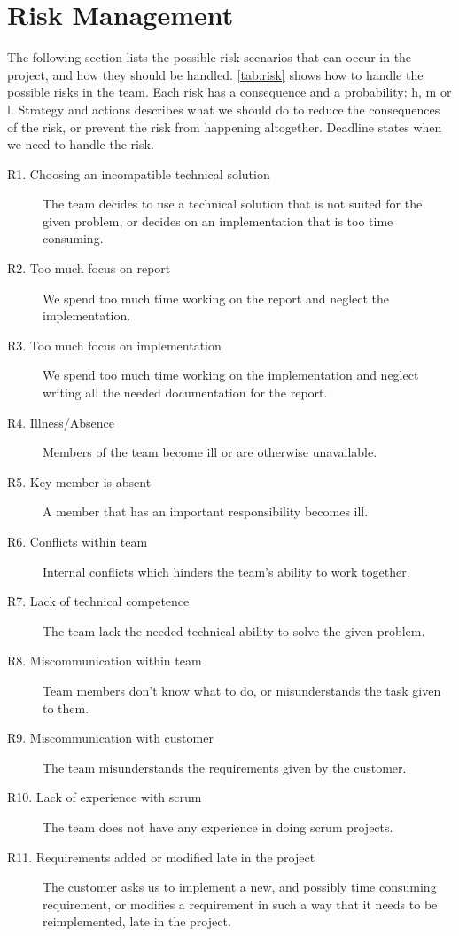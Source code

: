 \section{Risk Management}
\label{sec:plan:risk}
The following section lists the possible risk scenarios that can occur in the project, and how they should be handled. \autoref{tab:risk} shows how to handle the possible risks in the team. Each risk has a consequence and a probability:  \Gls{h}, \Gls{m} or \Gls{l}.
Strategy and actions describes what we should do to reduce the consequences of the risk, or prevent the risk from happening altogether. Deadline states when we need to handle the risk.
\begin{description}
\item[R1. Choosing an incompatible technical solution]  The team decides to use a technical solution that is not suited for the given problem, or decides on an implementation that is too time consuming.
\item[R2. Too much focus on report]  We spend too much time working on the report and neglect the implementation. 
\item[R3. Too much focus on implementation]  We spend too much time working on the implementation and neglect writing all the needed documentation for the report.
\item[R4. Illness/Absence]  Members of the team become ill or are otherwise unavailable. 
\item[R5. Key member is absent] A member that has an important responsibility becomes ill.
\item[R6. Conflicts within team]  Internal conflicts which hinders the team's ability to work together. 
\item[R7. Lack of technical competence]  The team lack the needed technical ability to solve the given problem. 
\item[R8. Miscommunication within team]  Team members don’t know what to do, or misunderstands the task given to them. 
\item[R9. Miscommunication with customer]  The team misunderstands the requirements given by the customer. 
\item[R10. Lack of experience with \Gls{scrum}]  The team does not have any experience in doing \Gls{scrum} projects.
\item[R11. Requirements added or modified late in the project] The customer asks us to implement a new, and possibly time consuming requirement, or modifies a requirement in such a way that it needs to be reimplemented, late in the project.
\end{description}

